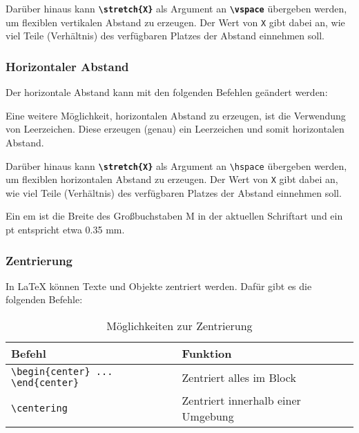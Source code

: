 Darüber hinaus kann \textbf{\texttt{\textbackslash stretch\{X\}}} als Argument an \textbf{\texttt{\textbackslash vspace}} übergeben werden, um flexiblen vertikalen Abstand zu erzeugen. Der Wert von \texttt{X} gibt dabei an, wie viel Teile (Verhältnis) des verfügbaren Platzes der Abstand einnehmen soll.

\subsubsection{Horizontaler Abstand}
Der horizontale Abstand kann mit den folgenden Befehlen geändert werden:



Eine weitere Möglichkeit, horizontalen Abstand zu erzeugen, ist die Verwendung von Leerzeichen. Diese erzeugen (genau) ein Leerzeichen und somit horizontalen Abstand.

Darüber hinaus kann \textbf{\texttt{\textbackslash stretch\{X\}}} als Argument an \texttt{\textbackslash hspace} übergeben werden, um flexiblen horizontalen Abstand zu erzeugen. Der Wert von \texttt{X} gibt dabei an, wie viel Teile (Verhältnis) des verfügbaren Platzes der Abstand einnehmen soll.

Ein em ist die Breite des Großbuchstaben M in der aktuellen Schriftart und ein pt entspricht etwa 0.35 mm.

\subsubsection{Zentrierung}
In \LaTeX{} können Texte und Objekte zentriert werden. Dafür gibt es die folgenden Befehle:
\begin{table}[H]
    \centering
    \renewcommand{\arraystretch}{1.2}
    \begin{tabular}{lp{6cm}c}
        \toprule
        \textbf{Befehl} & \textbf{Funktion}                  \\
        \midrule
        \texttt{\textbackslash begin\{center\} ... \textbackslash end\{center\}}
                        & Zentriert alles im Block           \\

        \texttt{\textbackslash centering}
                        & Zentriert innerhalb einer Umgebung \\
        \bottomrule
    \end{tabular}
    \caption{Möglichkeiten zur Zentrierung}
    \label{tab:center_vs_centering}
\end{table}

